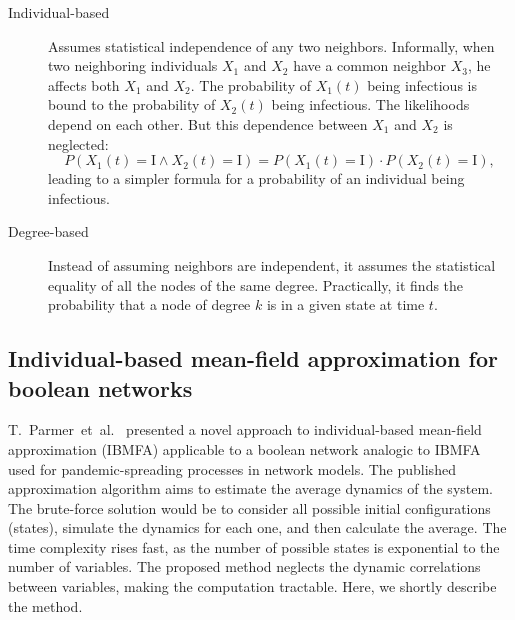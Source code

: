 \documentclass[
	digital, oneside, nosansbold, nocolorbold, nolot, nolof
]{fithesis4}
\theoremstyle{definition}
\theoremstyle{definition}
\begin{document}
\begin{description}
    \item[Individual-based] Assumes statistical independence of any two
        neighbors. Informally, when two neighboring individuals $X_1$ and $X_2$
        have a common neighbor $X_3$, he affects both $X_1$ and $X_2$. The
        probability of $X_1(t)$ being infectious is bound to the probability of
        $X_2(t)$ being infectious. The likelihoods depend on each other. But
        this dependence between $X_1$ and $X_2$ is neglected:
        \[
            P(X_1(t) = \text{I} \land X_2(t) = \text{I}) =
            P(X_1(t) = \text{I}) \cdot P(X_2(t) = \text{I}),
        \]
        leading to a simpler formula for a probability of an individual being
        infectious.
    \item[Degree-based] Instead of assuming neighbors are independent, it
        assumes the statistical equality of all the nodes of the same degree.
        Practically, it finds the probability that a node of degree $k$ is in
        a given state at time $t$.
\end{description}

\subsection{Individual-based mean-field approximation for boolean networks}
\label{section:IBMFA}

T.~Parmer~et~al.~\cite{infl_max_BN} presented a novel approach to
individual-based mean-field approximation (IBMFA) applicable to a boolean
network analogic to IBMFA used for pandemic-spreading processes in network
models. The published approximation algorithm aims to estimate the average
dynamics of the system. The brute-force solution would be to consider all
possible initial configurations (states), simulate the dynamics for each one,
and then calculate the average. The time complexity rises fast, as the number
of possible states is exponential to the number of variables.  The proposed
method neglects the dynamic correlations between variables, making the
computation tractable. Here, we shortly describe the method.
\end{document}
